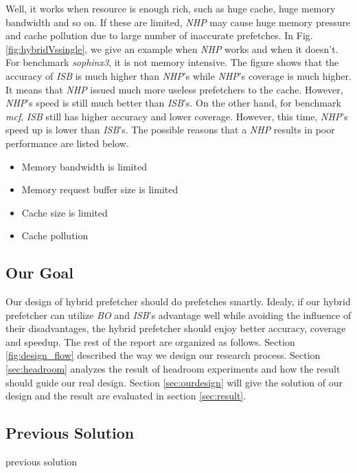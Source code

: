   Well, it works when resource is enough rich, such as huge cache, huge memory bandwidth and so on. If these are limited, \emph{NHP} may cause huge memory pressure and cache pollution due to large number of inaccurate prefetches. In Fig.\ref{fig:hybridVssingle}, we give an example when \emph{NHP} works and when it doesn't. For benchmark \emph{sophinx3}, it is not memory intensive. The figure shows that the accuracy of \emph{ISB} is much higher than \emph{NHP}'s while \emph{NHP}'s coverage is much higher. It means that \emph{NHP} issued much more useless prefetchers to the cache. However, \emph{NHP}'s speed is still much better than \emph{ISB}'s. On the other hand, for benchmark \emph{mcf}, \emph{ISB} still has higher accuracy and lower coverage. However, this time, \emph{NHP}'s speed up is lower than \emph{ISB}'s. The possible reasons that a \emph{NHP} results in poor performance are listed below.

  \begin{itemize}
    \item Memory bandwidth is limited
    \item Memory request buffer size is limited
    \item Cache size is limited
    \item Cache pollution
  \end{itemize}

  \subsection{Our Goal}
  \label{sec:goal}
  Our design of hybrid prefetcher should do prefetches smartly. Idealy, if our hybrid prefetcher can utilize \emph{BO} and \emph{ISB}'s advantage well while avoiding the influence of their disadvantages, the hybrid prefetcher should enjoy better accuracy, coverage and speedup. The rest of the report are organized as follows. Section \ref{fig:design_flow} described the way we design our research process. Section \ref{sec:headroom} analyzes the result of headroom experiments and how the result should guide our real design. Section \ref{sec:ourdesign} will give the solution of our design and the result are evaluated in section \ref{sec:result}.

  \subsection{Previous Solution}
  \label{sec:PrevSol}
  previous solution
